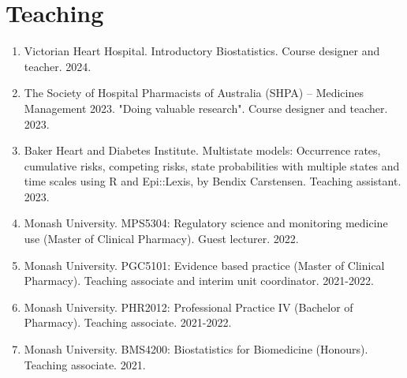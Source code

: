 \documentclass[11pt]{article}
\begin{document}
\section*{Teaching}
\begin{enumerate}
\item Victorian Heart Hospital. Introductory Biostatistics. Course designer and teacher. 2024.
\item The Society of Hospital Pharmacists of Australia (SHPA) – Medicines Management 2023. "Doing valuable research". Course designer and teacher. 2023.
\item Baker Heart and Diabetes Institute. Multistate models: Occurrence rates, cumulative risks, 
competing risks, state probabilities with multiple states and time scales using R and Epi::Lexis, by Bendix Carstensen. Teaching assistant. 2023.
\item Monash University. MPS5304: Regulatory science and monitoring medicine use (Master of Clinical Pharmacy). Guest lecturer. 2022.
\item Monash University. PGC5101: Evidence based practice (Master of Clinical Pharmacy). Teaching associate and interim unit coordinator. 2021-2022.
\item Monash University. PHR2012: Professional Practice IV (Bachelor of Pharmacy). Teaching associate. 2021-2022.
\item Monash University. BMS4200: Biostatistics for Biomedicine (Honours). Teaching associate. 2021.
\end{enumerate}
\end{document}
